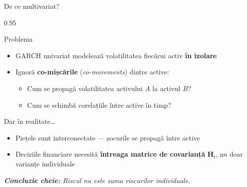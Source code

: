 \documentclass[9pt, aspectratio=169, t]{beamer}
\begin{document}
\begin{frame}{De ce multivariat?}
    \begin{cminipage}{0.95\textwidth}
    {\footnotesize
    \begin{block}{Problema}
        \begin{itemize}\setlength{\itemsep}{2pt}
            \item GARCH univariat modelează volatilitatea fiecărui activ \textbf{în izolare}
            \item Ignoră \textbf{co-mișcările} (\textit{co-movements}) dintre active:
                \begin{itemize}\setlength{\itemsep}{0pt}
                    \item Cum se propagă volatilitatea activului $A$ la activul $B$?
                    \item Cum se schimbă corelațiile între active în timp?
                \end{itemize}
        \end{itemize}
    \end{block}
    \vspace{0.1cm}
    \begin{alertblock}{Dar în realitate\ldots}
        \begin{itemize}\setlength{\itemsep}{0pt}
            \item Piețele sunt interconectate --- șocurile se propagă între active
            \item Deciziile financiare necesită \textbf{întreaga matrice de covarianță} $\mathbf{H}_t$, nu doar varianțe individuale
        \end{itemize}
    \end{alertblock}
    \vspace{0.2cm}
    \textit{\textbf{Concluzie cheie:} Riscul nu este suma riscurilor individuale.}
    }
    \end{cminipage}
\end{frame}
\end{document}
